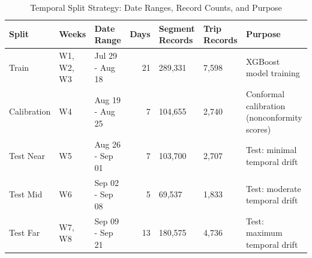 \begin{table}
\caption{Temporal Split Strategy: Date Ranges, Record Counts, and Purpose}
\label{tab:temporal_splits}
\begin{tabular}{lllrlll}
\toprule
Split & Weeks & Date Range & Days & Segment Records & Trip Records & Purpose \\
\midrule
Train & W1, W2, W3 & Jul 29 - Aug 18 & 21 & 289,331 & 7,598 & XGBoost model training \\
Calibration & W4 & Aug 19 - Aug 25 & 7 & 104,655 & 2,740 & Conformal calibration (nonconformity scores) \\
Test Near & W5 & Aug 26 - Sep 01 & 7 & 103,700 & 2,707 & Test: minimal temporal drift \\
Test Mid & W6 & Sep 02 - Sep 08 & 5 & 69,537 & 1,833 & Test: moderate temporal drift \\
Test Far & W7, W8 & Sep 09 - Sep 21 & 13 & 180,575 & 4,736 & Test: maximum temporal drift \\
\bottomrule
\end{tabular}
\end{table}
